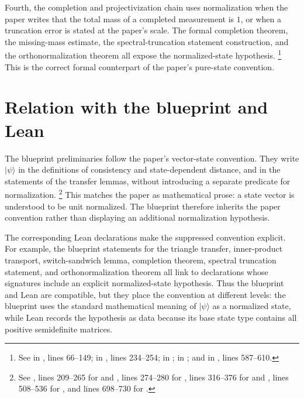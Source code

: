 \documentclass[11pt]{article}
\begin{document}
Fourth, the completion and projectivization chain uses normalization when the
paper writes that the total mass of a completed measurement is $1$, or when a
truncation error is stated at the paper's scale. The formal completion theorem,
the missing-mass estimate, the spectral-truncation statement construction, and
the orthonormalization theorem all expose the normalized-state hypothesis.
\footnote{See  in
, lines 66--149;
 in
, lines 234--254;
 in
;
 in
; and
 in
, lines
587--610.}
This is the correct formal counterpart of the paper's pure-state convention.

\section{Relation with the blueprint and Lean}

The blueprint preliminaries follow the paper's vector-state convention.  They
write $|\psi\rangle$ in the definitions of consistency and state-dependent
distance, and in the statements of the transfer lemmas, without introducing a
separate predicate for normalization.
\footnote{See , lines
209--265 for  and , lines 274--280 for
, lines 316--376 for  and
, lines 508--536 for
, and lines 698--730 for
.}
This matches the paper as mathematical prose: a state vector is understood to be
unit normalized.  The blueprint therefore inherits the paper convention rather
than displaying an additional normalization hypothesis.

The corresponding Lean declarations make the suppressed convention explicit.
For example, the blueprint statements for the triangle transfer, inner-product
transport, switch-sandwich lemma, completion theorem, spectral truncation
statement, and orthonormalization theorem all link to declarations whose
signatures include an explicit normalized-state hypothesis.  Thus the blueprint
and Lean are compatible, but they place the convention at different levels: the
blueprint uses the standard mathematical meaning of $|\psi\rangle$ as a
normalized state, while Lean records the hypothesis as data because its base
state type contains all positive semidefinite matrices.
\end{document}
